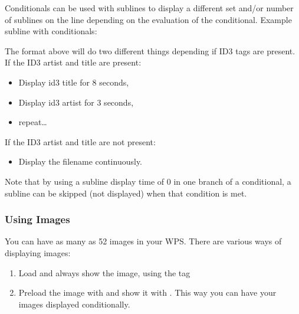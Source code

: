 Conditionals can be used with sublines to display a different set and/or number
of sublines on the line depending on the evaluation of the conditional.
Example subline with conditionals:
\begin{example}
\end{example}

The format above will do two different things depending if ID3 tags are 
present. If the ID3 artist and title are present:
\begin{itemize}
\item Display id3 title for 8 seconds,
\item Display id3 artist for 3 seconds,
\item repeat\dots
\end{itemize}
If the ID3 artist and title are not present:
\begin{itemize}
\item Display the filename continuously.
\end{itemize}
Note that by using a subline display time of 0 in one branch of a conditional,
a subline can be skipped (not displayed) when that condition is met. 

\subsubsection{Using Images}
You can have as many as 52 images in your WPS. There are various ways of 
displaying images:
\begin{enumerate}
  \item Load and always show the image, using the  tag
  \item Preload the image with  and show it with . 
    This way you can have your images displayed conditionally.
\end{enumerate}

%

